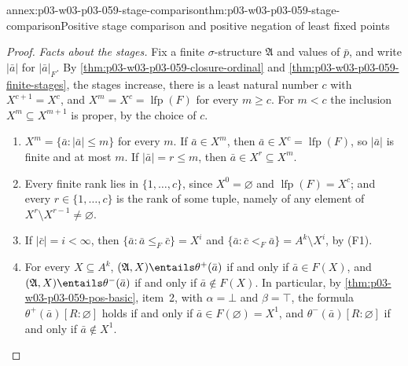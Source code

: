 \begin{annexitem}{annex:p03-w03-p03-059-stage-comparison}{thm:p03-w03-p03-059-stage-comparison}{Positive stage comparison and positive negation of least fixed points}
\begin{proof}
\emph{Facts about the stages.} Fix a finite \(\sigma\)-structure
\(\mathfrak A\) and values of \(\bar p\), and write \(|\bar a|\) for
\(|\bar a|_F\). By \cref{thm:p03-w03-p03-059-closure-ordinal} and
\cref{thm:p03-w03-p03-059-finite-stages}, the stages increase, there is a
least natural number \(c\) with \(X^{c+1}=X^c\), and
\(X^m=X^c=\operatorname{lfp}(F)\) for every \(m\geq c\). For \(m<c\) the
inclusion \(X^m\subseteq X^{m+1}\) is proper, by the choice of \(c\).
\begin{enumerate}
 \item[(F1)] \(X^m=\{\bar a:|\bar a|\leq m\}\) for every \(m\). If
       \(\bar a\in X^m\), then \(\bar a\in X^c=\operatorname{lfp}(F)\), so
       \(|\bar a|\) is finite and at most \(m\). If \(|\bar a|=r\leq m\),
       then \(\bar a\in X^r\subseteq X^m\).
 \item[(F2)] Every finite rank lies in \(\{1,\ldots,c\}\), since
       \(X^0=\varnothing\) and \(\operatorname{lfp}(F)=X^c\); and every
       \(r\in\{1,\ldots,c\}\) is the rank of some tuple, namely of any
       element of \(X^r\setminus X^{r-1}\neq\varnothing\).
 \item[(F3)] If \(|\bar c|=i<\infty\), then
       \(\{\bar a:\bar a\le_F\bar c\}=X^i\) and
       \(\{\bar a:\bar c<_F\bar a\}=A^k\setminus X^i\), by (F1).
 \item[(F4)] For every \(X\subseteq A^k\),
       \((\mathfrak A,X)\entails\theta^+(\bar a)\) if and only if
       \(\bar a\in F(X)\), and \((\mathfrak A,X)\entails\theta^-(\bar a)\)
       if and only if \(\bar a\notin F(X)\). In particular, by
       \cref{thm:p03-w03-p03-059-pos-basic}, item~2, with \(\alpha=\bot\)
       and \(\beta=\top\), the formula \(\theta^+(\bar a)[R:\varnothing]\)
       holds if and only if \(\bar a\in F(\varnothing)=X^1\), and
       \(\theta^-(\bar a)[R:\varnothing]\) if and only if
       \(\bar a\notin X^1\).
\end{enumerate}


\end{proof}
\end{annexitem}
